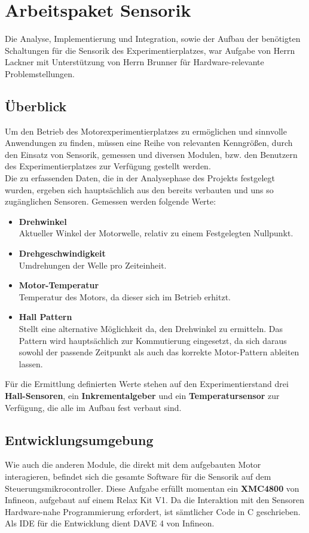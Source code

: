 \chapter{Arbeitspaket Sensorik}
Die Analyse, Implementierung und Integration, sowie der Aufbau der ben\"otigten Schaltungen f\"ur die Sensorik des Experimentierplatzes, war Aufgabe von Herrn Lackner mit Unterst\"utzung von Herrn Brunner f\"ur Hardware-relevante Problemstellungen.

\section{\"Uberblick}
Um den Betrieb des Motorexperimentierplatzes zu erm\"oglichen und sinnvolle Anwendungen zu finden, m\"ussen eine Reihe von relevanten Kenngr\"o{\ss}en, durch den Einsatz von Sensorik, gemessen und diversen Modulen, bzw. den Benutzern des Experimentierplatzes zur Verf\"ugung gestellt werden. \\
Die zu erfassenden Daten, die in der Analysephase des Projekts festgelegt wurden, ergeben sich haupts\"achlich aus den bereits verbauten und uns so zug\"anglichen Sensoren. Gemessen werden folgende Werte:
\begin{itemize}
\item \textbf{Drehwinkel} \\
Aktueller Winkel der Motorwelle, relativ zu einem Festgelegten Nullpunkt.
\item \textbf{Drehgeschwindigkeit} \\
Umdrehungen der Welle pro Zeiteinheit.
\item \textbf{Motor-Temperatur} \\
Temperatur des Motors, da dieser sich im Betrieb erhitzt.
\item \textbf{Hall Pattern} \\
Stellt eine alternative M\"oglichkeit da, den Drehwinkel zu ermitteln. Das Pattern wird haupts\"achlich zur Kommutierung eingesetzt, da sich daraus sowohl der passende Zeitpunkt als auch das korrekte Motor-Pattern ableiten lassen.
\end{itemize}
Für die Ermittlung definierten Werte stehen auf den Experimentierstand drei \textbf{Hall-Sensoren}, ein \textbf{Inkrementalgeber} und ein \textbf{Temperatursensor} zur Verfügung, die alle im Aufbau fest verbaut sind. 

\section{Entwicklungsumgebung}
Wie auch die anderen Module, die direkt mit dem aufgebauten Motor interagieren, befindet sich die gesamte Software für die Sensorik auf dem Steuerungsmikrocontroller. Diese Aufgabe erfüllt momentan ein \textbf{XMC4800} von Infineon, aufgebaut auf einem Relax Kit V1. Da die Interaktion mit den Sensoren Hardware-nahe Programmierung erfordert, ist sämtlicher Code in C geschrieben. Als IDE für die Entwicklung dient DAVE 4 von Infineon.

